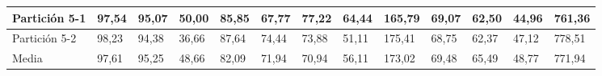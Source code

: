 \documentclass[10pt,a4paper]{article}
\begin{document}
\begin{table}[H]
{\begin{tabular}{|l|l|l|l|l|l|l|l|l|l|l|l|l|}
Partición 5-1                             & 97,54        & 95,07         & 50,00   & 85,85 & 67,77        & 77,22         & 64,44   & 165,79 & 69,07        & 62,50         & 44,96   & 761,36 \\ \hline
Partición 5-2                             & 98,23        & 94,38         & 36,66   & 87,64 & 74,44        & 73,88         & 51,11   & 175,41 & 68,75        & 62,37         & 47,12   & 778,51 \\ \hline
Media                                     & 97,61        & 95,25         & 48,66   & 82,09 & 71,94        & 70,94         & 56,11   & 173,02 & 69,48        & 65,49         & 48,77   & 771,94 \\ \hline
\end{tabular}}
\end{table}
\end{document}
